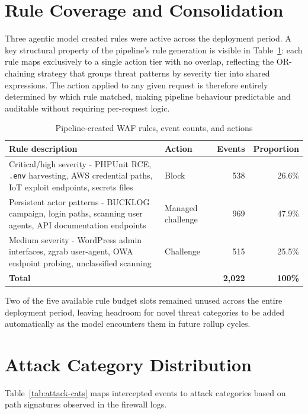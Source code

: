 \documentclass[12pt, a4paper]{report}   %
\begin{document}
\section{Rule Coverage and Consolidation}
\label{sec:rule-coverage}

Three agentic model created rules were active across the deployment
period. A key structural property of the pipeline's rule
generation is visible in Table~\ref{tab:rule-perf}: each rule
maps exclusively to a single action tier with no overlap,
reflecting the OR-chaining strategy that groups threat patterns
by severity tier into shared expressions. The action applied
to any given request is therefore entirely determined by which
rule matched, making pipeline behaviour predictable and
auditable without requiring per-request logic.

\begin{table}[H]
\centering
\caption{Pipeline-created WAF rules, event counts, and actions}
\label{tab:rule-perf}
\begin{tabular}{p{6.5cm}lrr}
\hline
\textbf{Rule description} & \textbf{Action} & \textbf{Events}
& \textbf{Proportion} \\
\hline
Critical/high severity - PHPUnit RCE, \texttt{.env}
harvesting, AWS credential paths, IoT exploit
endpoints, secrets files
  & Block             & 538 & 26.6\% \\
Persistent actor patterns - BUCKLOG campaign,
login paths, scanning user agents, API
documentation endpoints
  & Managed challenge & 969 & 47.9\% \\
Medium severity - WordPress admin interfaces,
zgrab user-agent, OWA endpoint probing,
unclassified scanning
  & Challenge         & 515 & 25.5\% \\
\hline
\textbf{Total} & & \textbf{2,022} & \textbf{100\%} \\
\hline
\end{tabular}
\end{table}

Two of the five available rule budget slots remained unused
across the entire deployment period, leaving headroom for
novel threat categories to be added automatically as the
model encounters them in future rollup cycles.

\section{Attack Category Distribution}
\label{sec:attack-cats}

Table~\ref{tab:attack-cats} maps intercepted events to attack
categories based on path signatures observed in the firewall
logs.
\end{document}
